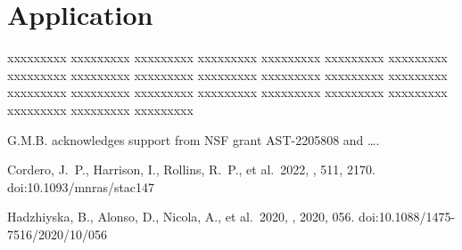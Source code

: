 \documentclass[linenumbers, onecolumn]{aastex63}
\begin{document}
\section{Application}\label{sec:app}

xxxxxxxxx xxxxxxxxx xxxxxxxxx xxxxxxxxx xxxxxxxxx xxxxxxxxx 
xxxxxxxxx xxxxxxxxx xxxxxxxxx xxxxxxxxx xxxxxxxxx xxxxxxxxx 
xxxxxxxxx xxxxxxxxx xxxxxxxxx xxxxxxxxx xxxxxxxxx xxxxxxxxx 
xxxxxxxxx xxxxxxxxx xxxxxxxxx xxxxxxxxx xxxxxxxxx xxxxxxxxx 

  \begin{acknowledgments}


G.M.B. acknowledges support from NSF grant AST-2205808 and \ldots.

\end{acknowledgments}
\begin{thebibliography}{dummy}
%
%
 Cordero, J.~P., Harrison, I., Rollins, R.~P., et al.\ 2022, \mnras, 511, 2170. doi:10.1093/mnras/stac147

 Hadzhiyska, B., Alonso, D., Nicola, A., et al.\ 2020, \jcap, 2020, 056. doi:10.1088/1475-7516/2020/10/056
\end{thebibliography}
\end{document}

